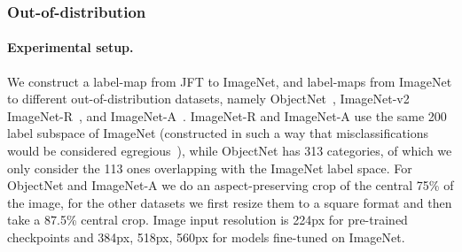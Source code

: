 \begin{table}
\centering
\caption{Zero-shot transfer results on ImageNet (variants).}
\label{tab:lit}
\end{table}

\subsubsection{Out-of-distribution}
\label{subsec:robustness_ood}


\paragraph{Experimental setup.} We construct a label-map from JFT to ImageNet, and label-maps from ImageNet to different out-of-distribution datasets, namely ObjectNet~\citep{barbu2019objectnet}, ImageNet-v2~\citep{recht2019imagenet_v2} ImageNet-R~\citep{hendrycks2020imagenet_r}, and ImageNet-A~\citep{hendrycks2021imagenet_a}. ImageNet-R and ImageNet-A use the same 200 label subspace of ImageNet (constructed in such a way that misclassifications would be considered egregious~\citep{hendrycks2021imagenet_a}), while ObjectNet has 313 categories, of which we only consider the 113 ones overlapping with the ImageNet label space. For ObjectNet and ImageNet-A we do an aspect-preserving crop of the central 75\% of the image, for the other datasets we first resize them to a square format and then take a 87.5\% central crop. Image input resolution is 224px for pre-trained checkpoints and 384px, 518px, 560px for models fine-tuned on ImageNet.


